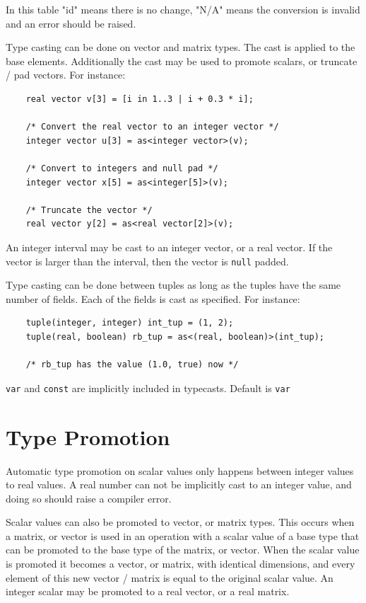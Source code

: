 \documentclass{article}
\begin{document}
  In this table "id" means there is no change, "N/A" means the conversion is invalid and an error should be raised.

  Type casting can be done on vector and matrix types. The cast is applied to the base elements. Additionally the cast
  may be used to promote scalars, or truncate / pad vectors. For instance:

  \begin{lstlisting}
    real vector v[3] = [i in 1..3 | i + 0.3 * i];

    /* Convert the real vector to an integer vector */
    integer vector u[3] = as<integer vector>(v);

    /* Convert to integers and null pad */
    integer vector x[5] = as<integer[5]>(v);

    /* Truncate the vector */
    real vector y[2] = as<real vector[2]>(v);
  \end{lstlisting}

  An integer interval may be cast to an integer vector, or a real vector. If the vector is larger than the interval,
  then the vector is \texttt{null} padded.

  Type casting can be done between tuples as long as the tuples have the same number of fields. Each of the fields is
  cast as specified. For instance:

  \begin{lstlisting}
    tuple(integer, integer) int_tup = (1, 2);
    tuple(real, boolean) rb_tup = as<(real, boolean)>(int_tup);

    /* rb_tup has the value (1.0, true) now */
  \end{lstlisting}

  \texttt{var} and \texttt{const} are implicitly included in typecasts. Default is \texttt{var}


\section{Type Promotion}\label{sec:typePromotion}

  Automatic type promotion on scalar values only happens between integer values to real values. A real number can not
  be implicitly cast to an integer value, and doing so should raise a compiler error.

  Scalar values can also be promoted to vector, or matrix types. This occurs when a matrix, or vector is used in an
  operation with a scalar value of a base type that can be promoted to the base type of the matrix, or vector. When
  the scalar value is promoted it becomes a vector, or matrix, with identical dimensions, and every element of this
  new vector / matrix is equal to the original scalar value. An integer scalar may be promoted to a real vector, or a
  real matrix.
\end{document}
